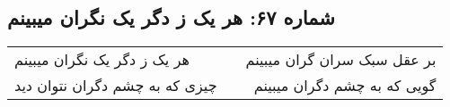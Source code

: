 \begin{center}
\section*{شماره ۶۷: هر یک ز دگر یک نگران میبینم}
\label{sec:067}
\begin{longtable}{l p{0.5cm} r}
هر یک ز دگر یک نگران میبینم
&&
بر عقل سبک سران گران میبینم
\\
چیزی که به چشم دگران نتوان دید
&&
گویی که به چشم دگران میبینم
\\
\end{longtable}
\end{center}
